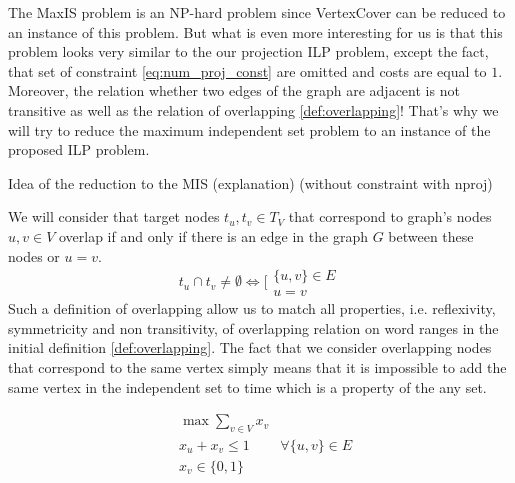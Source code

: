 The MaxIS problem is an NP-hard \cite{pemmaraju2003computational} problem since VertexCover can be reduced to an instance of
this problem. But what is even more interesting for us is that this problem looks very similar to the
our projection ILP problem, except the fact, that set of constraint \eqref{eq:num_proj_const} are
omitted and costs are equal to \( 1 \). Moreover, the relation whether two edges of the graph are adjacent
is not transitive as well as the relation of overlapping \ref{def:overlapping}! That's why we will try to reduce
the maximum independent set problem to an instance of the proposed ILP problem.

Idea of the reduction to the MIS (explanation) (without constraint with nproj)

We will consider that target nodes \( t_u, t_v \in T_{V} \) that correspond to graph's nodes \( u, v \in V \) overlap
if and only if there is an edge in the graph \( G \) between these nodes or \( u = v \).
\[
    t_u \cap t_v \neq \emptyset \Leftrightarrow
    \Biggl[
    \begin{array}{l}
        \{ u, v \} \in E \\
        u = v
    \end{array}
\]
Such a definition of overlapping allow us to match all properties, i.e. reflexivity, symmetricity and non transitivity,
of overlapping relation on word ranges in the initial definition \ref{def:overlapping}. The fact that we consider
overlapping nodes that correspond to the same vertex simply means that it is impossible to
add the same vertex in the independent set to time which is a property of the any set.

\begin{equation} \label{eq:reduction_without_nproj}
    \begin{aligned}
         & \max \sum\limits_{v \in V} x_v                          \\
         & x_u + x_v \leq 1               & \forall \{u, v\} \in E \\
         & x_v \in \{0, 1\}
    \end{aligned}
\end{equation}

